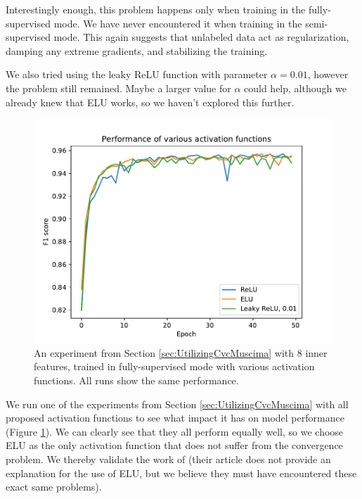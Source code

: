Interestingly enough, this problem happens only when training in the fully-supervised mode. We have never encountered it when training in the semi-supervised mode. This again suggests that unlabeled data act as regularization, damping any extreme gradients, and stabilizing the training.

We also tried using the leaky ReLU function with parameter $\alpha = 0.01$, however the problem still remained. Maybe a larger value for $\alpha$ could help, although we already knew that ELU works, so we haven't explored this further.

\begin{figure}[ht]
    \centering
    \includegraphics[width=140mm]{../../figures/03-activation-function/performance.pdf}
    \caption{An experiment from Section \ref{sec:UtilizingCvcMuscima} with 8 inner features, trained in fully-supervised mode with various activation functions. All runs show the same performance.}
    \label{fig:ActivationFunctionPerformances}
\end{figure}

We run one of the experiments from Section \ref{sec:UtilizingCvcMuscima} with all proposed activation functions to see what impact it has on model performance (Figure \ref{fig:ActivationFunctionPerformances}). We can clearly see that they all perform equally well, so we choose ELU as the only activation function that does not suffer from the convergence problem. We thereby validate the work of \cite{DorferEtAl} (their article does not provide an explanation for the use of ELU, but we believe they must have encountered these exact same problems).


